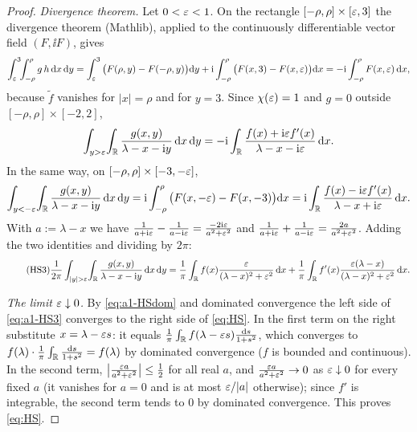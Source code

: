 \begin{proof}
\emph{Divergence theorem.} Let $0<\varepsilon<1$. On the rectangle $[-\rho,\rho]\times[\varepsilon,3]$ the divergence theorem (Mathlib), applied to the continuously differentiable vector field $(F,\ii F)$, gives
\[
 \int_\varepsilon^3\!\!\int_{-\rho}^{\rho}g\,h\,\mathrm{d} x\,\mathrm{d} y=\int_\varepsilon^3\big(F(\rho,y)-F(-\rho,y)\big)\mathrm{d} y+\mathrm{i}\int_{-\rho}^{\rho}\big(F(x,3)-F(x,\varepsilon)\big)\mathrm{d} x=-\mathrm{i}\int_{-\rho}^\rho F(x,\varepsilon)\,\mathrm{d} x,
\]
because $\tilde f$ vanishes for $|x|=\rho$ and for $y=3$. Since $\chi(\varepsilon)=1$ and $g=0$ outside $[-\rho,\rho]\times[-2,2]$,
\[
 \int_{y>\varepsilon}\!\int_{\mathbb{R}}\frac{g(x,y)}{\lambda-x-\mathrm{i} y}\,\mathrm{d} x\,\mathrm{d} y=-\mathrm{i}\int_{\mathbb{R}}\frac{f(x)+\mathrm{i}\varepsilon f'(x)}{\lambda-x-\mathrm{i}\varepsilon}\,\mathrm{d} x .
\]
In the same way, on $[-\rho,\rho]\times[-3,-\varepsilon]$,
\[
 \int_{y<-\varepsilon}\!\int_{\mathbb{R}}\frac{g(x,y)}{\lambda-x-\mathrm{i} y}\,\mathrm{d} x\,\mathrm{d} y=\mathrm{i}\int_{-\rho}^\rho\big(F(x,-\varepsilon)-F(x,-3)\big)\mathrm{d} x=\mathrm{i}\int_{\mathbb{R}}\frac{f(x)-\mathrm{i}\varepsilon f'(x)}{\lambda-x+\mathrm{i}\varepsilon}\,\mathrm{d} x .
\]
With $a:=\lambda-x$ we have $\frac1{a+\mathrm{i}\varepsilon}-\frac1{a-\mathrm{i}\varepsilon}=\frac{-2\mathrm{i}\varepsilon}{a^2+\varepsilon^2}$ and $\frac1{a+\mathrm{i}\varepsilon}+\frac1{a-\mathrm{i}\varepsilon}=\frac{2a}{a^2+\varepsilon^2}$. Adding the two identities and dividing by $2\pi$:
\begin{equation}\tag{HS3}\label{eq:a1-HS3}
 \frac1{2\pi}\int_{|y|>\eps}\!\int_\R\frac{g(x,y)}{\lambda-x-\ii y}\,\rd x\,\rd y=\frac1\pi\int_\R f(x)\frac{\eps}{(\lambda-x)^2+\eps^2}\,\rd x+\frac1\pi\int_\R f'(x)\frac{\eps(\lambda-x)}{(\lambda-x)^2+\eps^2}\,\rd x .
\end{equation}

\emph{The limit $\varepsilon\downarrow0$.} By \eqref{eq:a1-HSdom} and dominated convergence the left side of \eqref{eq:a1-HS3} converges to the right side of \eqref{eq:HS}.
In the first term on the right substitute $x=\lambda-\varepsilon s$: it equals $\frac1\pi\int_{\mathbb{R}} f(\lambda-\varepsilon s)\frac{\mathrm{d} s}{1+s^2}$, which converges to $f(\lambda)\cdot\frac1\pi\int_{\mathbb{R}}\frac{\mathrm{d} s}{1+s^2}=f(\lambda)$ by dominated convergence ($f$ is bounded and continuous).
In the second term, $\big|\frac{\varepsilon a}{a^2+\varepsilon^2}\big|\le\frac12$ for all real $a$, and $\frac{\varepsilon a}{a^2+\varepsilon^2}\to0$ as $\varepsilon\downarrow0$ for every fixed $a$ (it vanishes for $a=0$ and is at most $\varepsilon/|a|$ otherwise); since $f'$ is integrable, the second term
tends to $0$ by dominated convergence. This proves \eqref{eq:HS}.
\end{proof}

